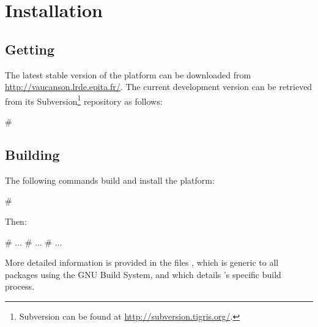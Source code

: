 \chapter{Installation}

\section{Getting \Vauc}

The latest stable version of the \Vauc platform can be downloaded
from \url{http://vaucanson.lrde.epita.fr/}.  The current development
version can be retrieved from its Subversion\footnote{%
  Subversion can be found at \url{http://subversion.tigris.org/}.
} repository as follows:

\begin{shell}
# 
\end{shell}

\section{Building \Vauc}

The following commands build and install the platform:
\begin{shell}
# 
\end{shell}
Then:
\begin{shell}
# 
...
# 
...
# 
...
\end{shell}

More detailed information is provided in the files ,
which is generic to all packages using the GNU Build System, and
 which details \Vauc's specific build process.


